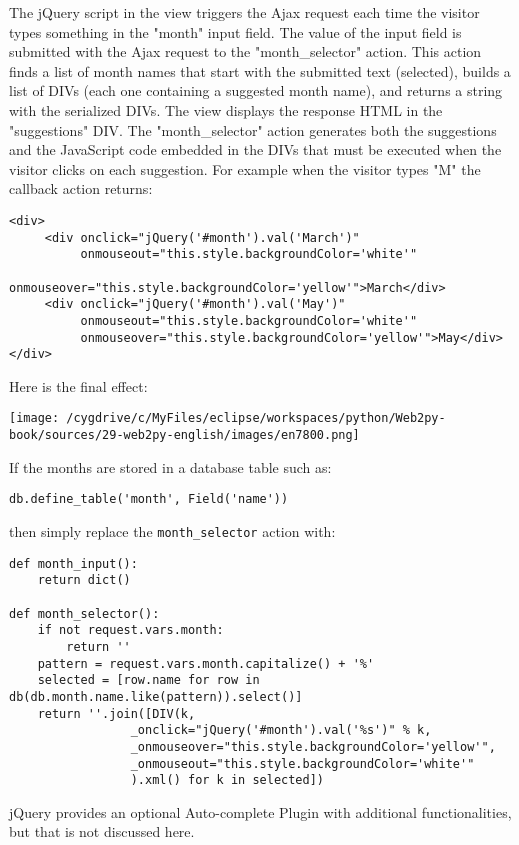 \documentclass[justified,sixbynine,notoc]{tufte-book}
\def\ft{\small\tt}
\begin{document}
\begin{fullwidth}
The jQuery script in the view triggers the Ajax request each time the visitor types something in the "month" input field. The value of the input field is submitted with the Ajax request to the "month\_selector" action. This action finds a list of month names that start with the submitted text (selected), builds a list of DIVs (each one containing a suggested month name), and returns a string with the serialized DIVs. The view displays the response HTML in the "suggestions" DIV. The "month\_selector" action generates both the suggestions and the JavaScript code embedded in the DIVs that must be executed when the visitor clicks on each suggestion. For example when the visitor types "M" the callback action returns:
\begin{lstlisting}[keywords={}]
<div>
     <div onclick="jQuery('#month').val('March')"
          onmouseout="this.style.backgroundColor='white'"
          onmouseover="this.style.backgroundColor='yellow'">March</div>
     <div onclick="jQuery('#month').val('May')"
          onmouseout="this.style.backgroundColor='white'"
          onmouseover="this.style.backgroundColor='yellow'">May</div>
</div>
\end{lstlisting}

Here is the final effect:


\goodbreak\begin{center}\texttt{[image: /cygdrive/c/MyFiles/eclipse/workspaces/python/Web2py-book/sources/29-web2py-english/images/en7800.png]}\end{center}


If the months are stored in a database table such as:
\begin{lstlisting}
db.define_table('month', Field('name'))
\end{lstlisting}
\noindent then simply replace the {\ft month\_selector} action with:
\begin{lstlisting}
def month_input():
    return dict()

def month_selector():
    if not request.vars.month:
        return ''
    pattern = request.vars.month.capitalize() + '%'
    selected = [row.name for row in db(db.month.name.like(pattern)).select()]
    return ''.join([DIV(k,
                 _onclick="jQuery('#month').val('%s')" % k,
                 _onmouseover="this.style.backgroundColor='yellow'",
                 _onmouseout="this.style.backgroundColor='white'"
                 ).xml() for k in selected])
\end{lstlisting}
\noindent jQuery provides an optional Auto-complete Plugin with additional functionalities, but that is not discussed here.


\end{fullwidth}
\end{document}
